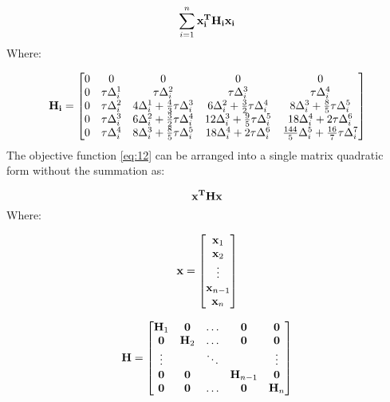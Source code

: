 \documentclass{article}
\begin{document}
\begin{equation}
    \label{eq:12}
    \sum_{i=1}^{n}\mathbf{x_i^TH_ix_i}
\end{equation}
Where:

\begin{equation*}
    \mathbf{H_i} = \begin{bmatrix}
        0 & 0 & 0 & 0 & 0 \\
        0 & \tau \Delta_i^1 & \tau \Delta_i^2 & \tau \Delta_i^3 & \tau \Delta_i^4 \\
        0 & \tau \Delta_i^2 & 4 \Delta_i^1 + \frac{4}{3} \tau \Delta_i^3 & 6 \Delta_i^2 + \frac{3}{2} \tau \Delta_i^4 & 8 \Delta_i^3 + \frac{8}{5} \tau \Delta_i^5 \\
        0 & \tau \Delta_i^3 & 6 \Delta_i^2 + \frac{3}{2} \tau \Delta_i^4 & 12 \Delta_i^3 + \frac{9}{5} \tau \Delta_i^5 & 18 \Delta_i^4 + 2 \tau \Delta_i^6 \\
        0 & \tau \Delta_i^4 & 8 \Delta_i^3 + \frac{8}{5} \tau \Delta_i^5 & 18 \Delta_i^4 + 2 \tau \Delta_i^6 & \frac{144}{5} \Delta_i^5 + \frac{16}{7} \tau \Delta_i^7
    \end{bmatrix}
\end{equation*}
The objective function \ref{eq:12} can be arranged into a single matrix quadratic form without
the summation as:

\begin{equation}
    \mathbf{x^THx}
\end{equation}
Where:

\begin{equation*}
    \mathbf{x} = \begin{bmatrix}
        \mathbf{x}_1 \\
        \mathbf{x}_2 \\
        \vdots \\
        \mathbf{x}_{n-1} \\
        \mathbf{x}_n \\
    \end{bmatrix}
\end{equation*}

\begin{equation*}
    \mathbf{H} = \begin{bmatrix}
        \mathbf{H}_1 & \mathbf{0} & \hdots & \mathbf{0} & \mathbf{0} \\
        \mathbf{0} & \mathbf{H}_2 & \hdots & \mathbf{0} & \mathbf{0} \\
        \vdots & & \ddots & & \vdots \\
        \mathbf{0} & \mathbf{0} & & \mathbf{H}_{n-1} & \mathbf{0} \\
        \mathbf{0} & \mathbf{0} & \hdots & \mathbf{0} & \mathbf{H}_n
    \end{bmatrix}
\end{equation*}
\end{document}
